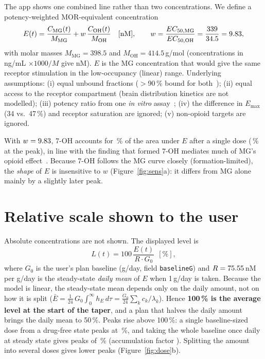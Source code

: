 \documentclass[10pt,a4paper]{article}
\newcommand{\MG}{\mathrm{MG}}
\newcommand{\OH}{\mathrm{OH}}
\begin{document}
The app shows one combined line rather than two concentrations. We define a potency-weighted MOR-equivalent concentration
\begin{equation}
E(t)=\frac{C_{\MG}(t)}{M_{\MG}}+w\,\frac{C_{\OH}(t)}{M_{\OH}}\quad[\mathrm{nM}],\qquad
w=\frac{EC_{50,\MG}}{EC_{50,\OH}}=\frac{339}{34.5}=\nW,
\end{equation}
with molar masses $M_{\MG}=398.5$ and $M_{\OH}=414.5$\,g/mol (concentrations in ng/mL $\times 1000/M$ give nM). $E$ is the
MG concentration that would give the same receptor stimulation in the low-occupancy (linear) range.
Underlying assumptions: (i) equal unbound fractions ($>$90\,\% bound for both~\cite{manda2014}); (ii) equal access to the
receptor compartment (brain distribution kinetics are not modelled); (iii) potency ratio from one \emph{in vitro} assay~\cite{kruegel2016};
(iv) the difference in $E_{\max}$ (34 vs.\ 47\,\%) and receptor saturation are ignored; (v) non-opioid targets are ignored.

With $w=9.83$, 7-OH accounts for \nshareOHauc\,\% of the area under $E$ after a single dose (\nshareOHpeak\,\% at the peak),
in line with the finding that formed 7-OH mediates much of MG's opioid effect~\cite{kruegel2019}. Because 7-OH follows the MG
curve closely (formation-limited), the \emph{shape} of $E$ is insensitive to $w$ (Figure~\ref{fig:sens}a): it differs from MG alone mainly by a
slightly later peak.

\section{Relative scale shown to the user}

Absolute concentrations are not shown. The displayed level is
\begin{equation}
L(t)=100\,\frac{E(t)}{R\cdot G_0}\ \ [\%],
\end{equation}
where $G_0$ is the user's plan baseline (g/day, field \texttt{baselineG}) and $R=75.55$\,nM per g/day is the steady-state
\emph{daily mean} of $E$ when 1\,g/day is taken. Because the model is linear, the steady-state mean depends only on the daily amount,
not on how it is split ($\bar E = \tfrac{1}{24}\,G_0\int_0^\infty h_E\,d\tau = \tfrac{G_0}{24}\sum_k c_k/\lambda_k$). Hence
\textbf{100\,\% is the average level at the start of the taper}, and a plan that halves the daily amount brings the daily
mean to 50\,\%. Peaks rise above 100\,\%: a single baseline-sized dose from a drug-free state peaks at \nsinglepeakrel\,\%, and
taking the whole baseline once daily at steady state gives peaks of \nsspeakrel\,\% (accumulation factor \naccum). Splitting the
amount into several doses gives lower peaks (Figure~\ref{fig:dose}b).
\end{document}
